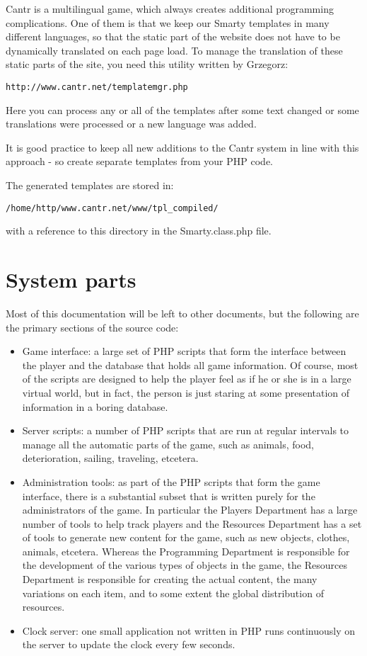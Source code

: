 \documentclass[a4paper,12pt]{article}
\begin{document}
Cantr is a multilingual game, which always creates additional programming complications. One of them is that we keep our Smarty templates in many different languages, so that the static part of the website does not have to be dynamically translated on each page load. To manage the translation of these static parts of the site, you need this utility written by Grzegorz:
\begin{verbatim}
http://www.cantr.net/templatemgr.php
\end{verbatim}
Here you can process any or all of the templates after some text changed or some translations were processed or a new language was added.

It is good practice to keep all new additions to the Cantr system in line with this approach - so create separate templates from your PHP code.

The generated templates are stored in:
\begin{verbatim}
/home/http/www.cantr.net/www/tpl_compiled/
\end{verbatim}
with a reference to this directory in the Smarty.class.php file.

\section{System parts}

Most of this documentation will be left to other documents, but the following are the primary sections of the source code:

\begin{itemize}
\item Game interface: a large set of PHP scripts that form the interface between the player and the database that holds all game information. Of course, most of the scripts are designed to help the player feel as if he or she is in a large virtual world, but in fact, the person is just staring at some presentation of information in a boring database.
\item Server scripts: a number of PHP scripts that are run at regular intervals to manage all the automatic parts of the game, such as animals, food, deterioration, sailing, traveling, etcetera.
\item Administration tools: as part of the PHP scripts that form the game interface, there is a substantial subset that is written purely for the administrators of the game. In particular the Players Department has a large number of tools to help track players and the Resources Department has a set of tools to generate new content for the game, such as new objects, clothes, animals, etcetera. Whereas the Programming Department is responsible for the development of the various types of objects in the game, the Resources Department is responsible for creating the actual content, the many variations on each item, and to some extent the global distribution of resources.
\item Clock server: one small application not written in PHP runs continuously on the server to update the clock every few seconds.
\end{itemize}
\end{document}

